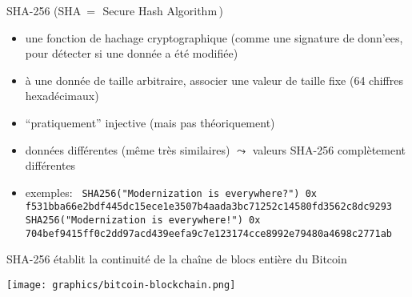 
\begin{frame}{\LARGE SHA-256 \normalsize(SHA \,=\, \guillemotleft\,Secure Hash Algorithm\,\guillemotright)}

\normalsize

\begin{itemize}
\item
	une fonction de hachage cryptographique
	\vskip -0.1cm
	{\scriptsize(comme une {\color{red}signature} de donn'ees, pour d\'etecter si une donn\'ee a \'et\'e modifi\'ee)}

\vskip 0.3cm
\item
	\`a une donn\'ee de taille arbitraire, associer une valeur de taille fixe (64 chiffres hexad\'ecimaux)

\vskip 0.3cm
\item
	``pratiquement'' injective (mais pas th\'eoriquement)

\vskip 0.3cm
\item
	donn\'ees diff\'erentes (m\^eme tr\`es similaires) \;$\leadsto$\; valeurs SHA-256 compl\`etement diff\'erentes

\vskip 0.3cm
\item
	exemples:
	\vskip 0.18cm{\tt\tiny
	{\footnotesize SHA256("Modernization is everywhere{\color{red}?}")}
	\vskip 0.02cm
	0x f531bba66e2bdf445dc15ece1e3507b4aada3bc71252c14580fd3562c8dc9293
	\vskip 0.3cm
	{\footnotesize SHA256("Modernization is everywhere{\color{red}!}")}
	\vskip -0.21cm
	0x 704bef9415ff0c2dd97acd439eefa9c7e123174cce8992e79480a4698c2771ab}
\end{itemize}

\end{frame}
\normalsize


\begin{frame}{\Large SHA-256 \'etablit la continuit\'e de la cha\^ine de blocs enti\`ere du Bitcoin}

\begin{center}
\texttt{[image: graphics/bitcoin-blockchain.png]}
\end{center}

\end{frame}
\normalsize

